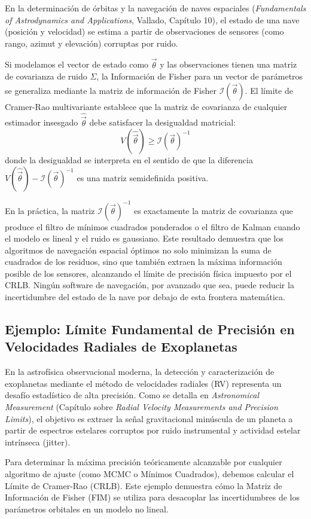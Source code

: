 En la determinación de órbitas y la navegación de naves espaciales (\textit{Fundamentals of Astrodynamics and Applications}, Vallado, Capítulo 10), el estado de una nave (posición y velocidad) se estima a partir de observaciones de sensores (como rango, azimut y elevación) corruptas por ruido. 

Si modelamos el vector de estado como $\vec{\theta}$ y las observaciones tienen una matriz de covarianza de ruido $\Sigma$, la Información de Fisher para un vector de parámetros se generaliza mediante la matriz de información de Fisher $\mathcal{I}(\vec{\theta})$. El límite de Cramer-Rao multivariante establece que la matriz de covarianza de cualquier estimador insesgado $\hat{\vec{\theta}}$ debe satisfacer la desigualdad matricial:
$$ V(\hat{\vec{\theta}}) \ge \mathcal{I}(\vec{\theta})^{-1} $$
donde la desigualdad se interpreta en el sentido de que la diferencia $V(\hat{\vec{\theta}}) - \mathcal{I}(\vec{\theta})^{-1}$ es una matriz semidefinida positiva.

En la práctica, la matriz $\mathcal{I}(\vec{\theta})^{-1}$ es exactamente la matriz de covarianza que produce el filtro de mínimos cuadrados ponderados o el filtro de Kalman cuando el modelo es lineal y el ruido es gaussiano. Este resultado demuestra que los algoritmos de navegación espacial óptimos no solo minimizan la suma de cuadrados de los residuos, sino que también extraen la máxima información posible de los sensores, alcanzando el límite de precisión física impuesto por el CRLB. Ningún software de navegación, por avanzado que sea, puede reducir la incertidumbre del estado de la nave por debajo de esta frontera matemática.

\subsection{Ejemplo: Límite Fundamental de Precisión en Velocidades Radiales de Exoplanetas}

En la astrofísica observacional moderna, la detección y caracterización de exoplanetas mediante el método de velocidades radiales (RV) representa un desafío estadístico de alta precisión. Como se detalla en \textit{Astronomical Measurement} (Capítulo sobre \textit{Radial Velocity Measurements and Precision Limits}), el objetivo es extraer la señal gravitacional minúscula de un planeta a partir de espectros estelares corruptos por ruido instrumental y actividad estelar intrínseca (jitter). 

Para determinar la máxima precisión teóricamente alcanzable por cualquier algoritmo de ajuste (como MCMC o Mínimos Cuadrados), debemos calcular el Límite de Cramer-Rao (CRLB). Este ejemplo demuestra cómo la Matriz de Información de Fisher (FIM) se utiliza para desacoplar las incertidumbres de los parámetros orbitales en un modelo no lineal.

